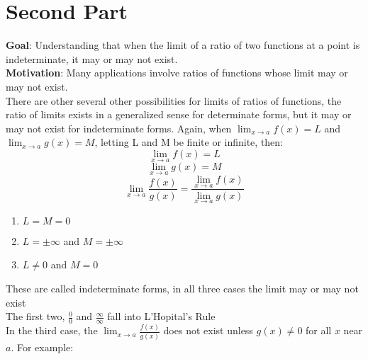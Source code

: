\documentclass[12pt, letterpaper]{article}
\begin{document}
\section{Second Part}
\textbf{Goal}: Understanding that when the limit of a ratio of two functions at a point is indeterminate, it may or may not exist.\\
\newline
\textbf{Motivation}: Many applications involve ratios of functions whose limit may or may not exist.\\
\newline
There are other several other possibilities for limits of ratios of functions, the ratio of limits exists in a generalized sense for determinate forms, but it may or may not exist for indeterminate forms. Again, when \(\lim_{x \to a}f(x)=L\) and \(\lim_{x \to a}g(x)=M\), letting L and M be finite or infinite, then:
\[\lim_{x \to a}f(x)=L\]
\[\lim_{x \to a}g(x)=M\]
\[\lim_{x \to a}\frac{f(x)}{g(x)} = \frac{\lim_{x \to a}f(x)}{\lim_{x \to a}g(x)}\]
\begin{enumerate}
    \item \(L = M = 0\)
    \item \(L = \pm \infty\) and \(M = \pm \infty\)
    \item \(L \neq 0\) and \(M=0\)
\end{enumerate}
These are called indeterminate forms, in all three cases the limit may or may not exist\\
\newline
The first two, \(\frac{0}{0}\) and \(\frac{\infty}{\infty}\) fall into L'Hopital's Rule\\
\newline
In the third case, the \(\lim_{x \to a}\frac{f(x)}{g(x)}\) does not exist unless \(g(x) \neq 0\) for all \(x\) near \(a\). For example:
\end{document}
